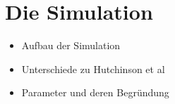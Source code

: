 \section{Die Simulation}
\begin{itemize}
	\item Aufbau der Simulation
	\item Unterschiede zu Hutchinson et al
	\item Parameter und deren Begründung
\end{itemize}